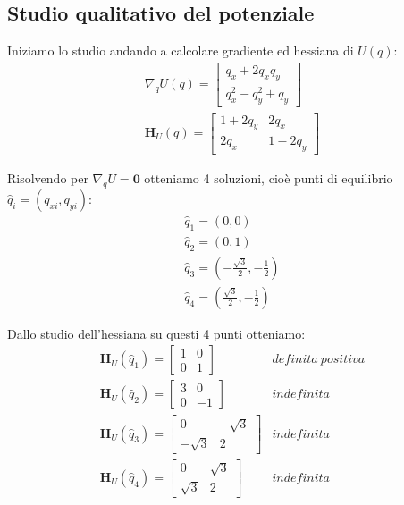 \documentclass[a4paper]{article}
\numberwithin{equation}{section}
\numberwithin{figure}{section}
\newcommand{\hess}[1]{\mathbf{H}_{#1}}
\begin{document}
\subsection{Studio qualitativo del potenziale}

Iniziamo lo studio andando a calcolare gradiente ed hessiana di $U(q)$:
\begin{eqnarray}
	\nabla_q U(q)= 
	\begin{bmatrix}
		q_x + 2q_xq_y\\
		q_x^2 - q_y^2 + q_y
	\end{bmatrix}\\[0.2cm]
% 
	\hess{U}(q)=
	\begin{bmatrix}
		1 + 2q_y & 2q_x\\
		2q_x & 1 - 2q_y
	\end{bmatrix}
\end{eqnarray}

Risolvendo per $\nabla_q U = \mathbf{0}$ otteniamo 4 soluzioni, cioè punti di equilibrio
$\hat{q}_i = (q_{xi}, q_{yi})$:
\begin{eqnarray*}
	\hat{q}_1 = (0,0)\\
	\hat{q}_2 = (0,1)\\
	\hat{q}_3 = (-\frac{\sqrt{3}}{2}, -\frac{1}{2})\\
	\hat{q}_4 = (\frac{\sqrt{3}}{2}, -\frac{1}{2})
\end{eqnarray*}

Dallo studio dell'hessiana su questi 4 punti otteniamo:
\begin{eqnarray*}
\hess{U}(\hat{q}_1) =
	\begin{bmatrix}
		1& 0\\ 0 & 1
	\end{bmatrix} &definita\ positiva\\
%
\hess{U}(\hat{q}_2) = 
	\begin{bmatrix}
		3 & 0 \\ 0 & -1	
	\end{bmatrix} &indefinita\\
%
\hess{U}(\hat{q}_3) = 
	\begin{bmatrix}
		0 & -\sqrt{3} \\
		-\sqrt{3} & 2
	\end{bmatrix}&indefinita\\
%
\hess{U}(\hat{q}_4) = 
	\begin{bmatrix}
		0 & \sqrt{3} \\
		\sqrt{3} & 2
	\end{bmatrix}&indefinita\\
\end{eqnarray*}
\end{document}
